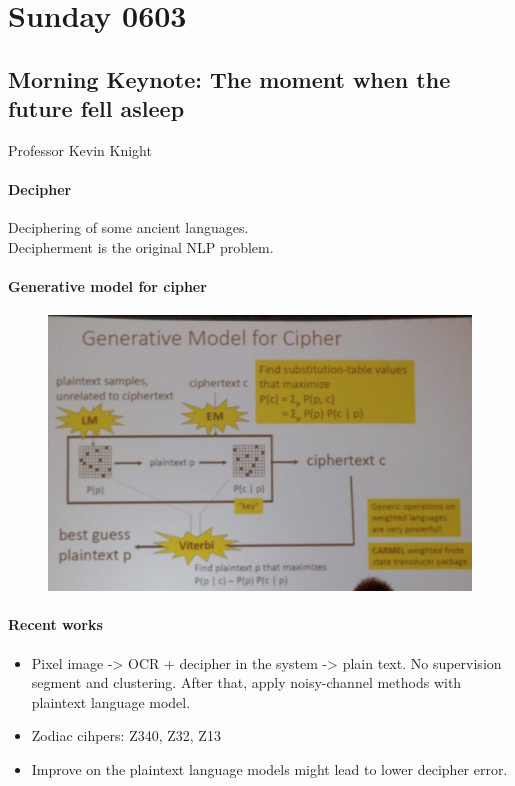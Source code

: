 \section{Sunday 0603}

\subsection{Morning Keynote: The moment when the future fell asleep}
Professor Kevin Knight
\paragraph{Decipher}
Deciphering of some ancient languages.\\
Decipherment is the original NLP problem.

\paragraph{Generative model for cipher}
\begin{figure}
	\centering 
	\includegraphics[scale=0.8]{fig0603/kn-cipher-model}
\end{figure}

\paragraph{Recent works}
\begin{itemize}
\item Pixel image -> OCR + decipher in the system -> plain text. No supervision segment and clustering. After that, apply noisy-channel methods with plaintext language model.
\item Zodiac cihpers: Z340, Z32, Z13
\item Improve on the plaintext language models might lead to lower decipher error.
\end{itemize}

